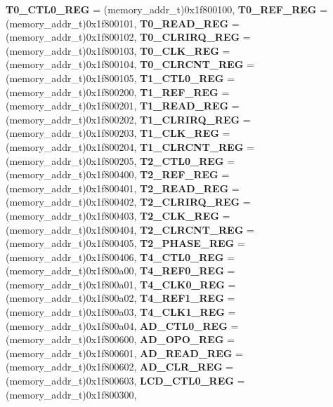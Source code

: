 \begin{DoxyCompactItemize}
{\bfseries T0\+\_\+\+C\+T\+L0\+\_\+\+R\+EG} = (memory\+\_\+addr\+\_\+t)0x1f800100, 
{\bfseries T0\+\_\+\+R\+E\+F\+\_\+\+R\+EG} = (memory\+\_\+addr\+\_\+t)0x1f800101, 
{\bfseries T0\+\_\+\+R\+E\+A\+D\+\_\+\+R\+EG} = (memory\+\_\+addr\+\_\+t)0x1f800102, 
{\bfseries T0\+\_\+\+C\+L\+R\+I\+R\+Q\+\_\+\+R\+EG} = (memory\+\_\+addr\+\_\+t)0x1f800103, 
{\bfseries T0\+\_\+\+C\+L\+K\+\_\+\+R\+EG} = (memory\+\_\+addr\+\_\+t)0x1f800104, 
{\bfseries T0\+\_\+\+C\+L\+R\+C\+N\+T\+\_\+\+R\+EG} = (memory\+\_\+addr\+\_\+t)0x1f800105, 
{\bfseries T1\+\_\+\+C\+T\+L0\+\_\+\+R\+EG} = (memory\+\_\+addr\+\_\+t)0x1f800200, 
\newline
{\bfseries T1\+\_\+\+R\+E\+F\+\_\+\+R\+EG} = (memory\+\_\+addr\+\_\+t)0x1f800201, 
{\bfseries T1\+\_\+\+R\+E\+A\+D\+\_\+\+R\+EG} = (memory\+\_\+addr\+\_\+t)0x1f800202, 
{\bfseries T1\+\_\+\+C\+L\+R\+I\+R\+Q\+\_\+\+R\+EG} = (memory\+\_\+addr\+\_\+t)0x1f800203, 
{\bfseries T1\+\_\+\+C\+L\+K\+\_\+\+R\+EG} = (memory\+\_\+addr\+\_\+t)0x1f800204, 
{\bfseries T1\+\_\+\+C\+L\+R\+C\+N\+T\+\_\+\+R\+EG} = (memory\+\_\+addr\+\_\+t)0x1f800205, 
{\bfseries T2\+\_\+\+C\+T\+L0\+\_\+\+R\+EG} = (memory\+\_\+addr\+\_\+t)0x1f800400, 
{\bfseries T2\+\_\+\+R\+E\+F\+\_\+\+R\+EG} = (memory\+\_\+addr\+\_\+t)0x1f800401, 
{\bfseries T2\+\_\+\+R\+E\+A\+D\+\_\+\+R\+EG} = (memory\+\_\+addr\+\_\+t)0x1f800402, 
{\bfseries T2\+\_\+\+C\+L\+R\+I\+R\+Q\+\_\+\+R\+EG} = (memory\+\_\+addr\+\_\+t)0x1f800403, 
{\bfseries T2\+\_\+\+C\+L\+K\+\_\+\+R\+EG} = (memory\+\_\+addr\+\_\+t)0x1f800404, 
{\bfseries T2\+\_\+\+C\+L\+R\+C\+N\+T\+\_\+\+R\+EG} = (memory\+\_\+addr\+\_\+t)0x1f800405, 
{\bfseries T2\+\_\+\+P\+H\+A\+S\+E\+\_\+\+R\+EG} = (memory\+\_\+addr\+\_\+t)0x1f800406, 
{\bfseries T4\+\_\+\+C\+T\+L0\+\_\+\+R\+EG} = (memory\+\_\+addr\+\_\+t)0x1f800a00, 
{\bfseries T4\+\_\+\+R\+E\+F0\+\_\+\+R\+EG} = (memory\+\_\+addr\+\_\+t)0x1f800a01, 
{\bfseries T4\+\_\+\+C\+L\+K0\+\_\+\+R\+EG} = (memory\+\_\+addr\+\_\+t)0x1f800a02, 
{\bfseries T4\+\_\+\+R\+E\+F1\+\_\+\+R\+EG} = (memory\+\_\+addr\+\_\+t)0x1f800a03, 
{\bfseries T4\+\_\+\+C\+L\+K1\+\_\+\+R\+EG} = (memory\+\_\+addr\+\_\+t)0x1f800a04, 
{\bfseries A\+D\+\_\+\+C\+T\+L0\+\_\+\+R\+EG} = (memory\+\_\+addr\+\_\+t)0x1f800600, 
{\bfseries A\+D\+\_\+\+O\+P\+O\+\_\+\+R\+EG} = (memory\+\_\+addr\+\_\+t)0x1f800601, 
{\bfseries A\+D\+\_\+\+R\+E\+A\+D\+\_\+\+R\+EG} = (memory\+\_\+addr\+\_\+t)0x1f800602, 
\newline
{\bfseries A\+D\+\_\+\+C\+L\+R\+\_\+\+R\+EG} = (memory\+\_\+addr\+\_\+t)0x1f800603, 
{\bfseries L\+C\+D\+\_\+\+C\+T\+L0\+\_\+\+R\+EG} = (memory\+\_\+addr\+\_\+t)0x1f800300, 

\end{DoxyCompactItemize}
